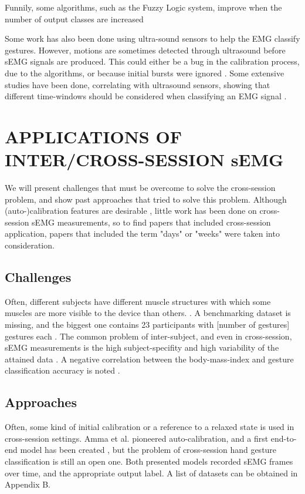 \documentclass{article}
\begin{document}
Funnily, some algorithms, such as the Fuzzy Logic system, improve when the number of output classes are increased \cite{El-Khoury2015}

Some work has also been done using ultra-sound sensors to help the EMG classify gestures. However, motions are sometimes detected through ultrasound before sEMG signals are produced. This could either be a bug in the calibration process, due to the algorithms, or because initial bursts were ignored \cite{Dieterich2017}. Some extensive studies have been done, correlating with ultrasound sensors, showing that different time-windows should be considered when classifying an EMG signal \cite{Dieterich2017}. 


\section{APPLICATIONS OF INTER/CROSS-SESSION sEMG}
We will present challenges that must be overcome to solve the cross-session problem, and show past approaches that tried to solve this problem. Although (auto-)calibration features are desirable \cite{Amma2015}, little work has been done on cross-session sEMG measurements, so \cite{Martinez-Valdes2016} to find papers that included cross-session application, papers that included the term "days" or "weeks" were taken into consideration.

\subsection{Challenges}
Often, different subjects have different muscle structures with which some muscles are more visible to the device than others. \cite{Martinez-Valdes2016}. A benchmarking dataset is missing, and the biggest one contains 23 participants with [number of gestures] gestures each \cite{Du2017}. The common problem of inter-subject, and even in cross-session, sEMG measurements is the high subject-specifity and high variability of the attained data \cite{Castellini2009} \cite{Farina2014}. A negative correlation between the body-mass-index and gesture classification accuracy is noted \cite{Atzori2015} \cite{Holobar2014}.

\subsection{Approaches}
Often, some kind of initial calibration \cite{Saponas2010} or a reference to a relaxed state \cite{Dieterich2017} is used in cross-session settings. Amma et al. \cite{Amma2015} pioneered auto-calibration, and a first end-to-end model has been created \cite{Du2017}, but the problem of cross-session hand gesture classification is still an open one. Both presented models recorded sEMG frames over time, and the appropriate output label. A list of datasets can be obtained in Appendix B. 
\end{document}
